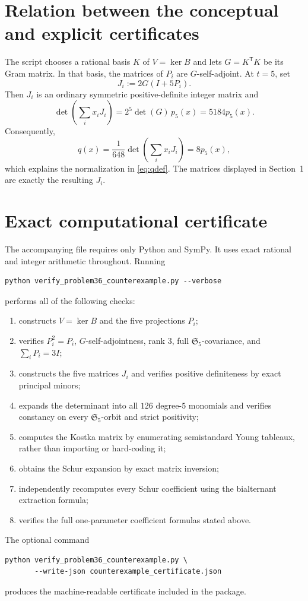 \documentclass[11pt]{article}
\theoremstyle{remark}
\newcommand{\Sym}{\mathfrak S}
\begin{document}
\section{Relation between the conceptual and explicit certificates}

The script chooses a rational basis $K$ of $V=\ker B$ and lets
$G=K^{\mathsf T}K$ be its Gram matrix.  In that basis, the matrices of $P_i$ are
$G$-self-adjoint.  At $t=5$, set
\[
J_i:=2G(I+5P_i).
\]
Then $J_i$ is an ordinary symmetric positive-definite integer matrix and
\[
\det\!\left(\sum_i x_iJ_i\right)
=2^5\det(G)\,p_5(x)=5184p_5(x).
\]
Consequently,
\[
q(x)=\frac1{648}\det\!\left(\sum_i x_iJ_i\right)=8p_5(x),
\]
which explains the normalization in \eqref{eq:qdef}.  The matrices displayed in
Section~1 are exactly the resulting $J_i$.

\section{Exact computational certificate}
\label{sec:certificate}

The accompanying file  requires only Python and SymPy.
It uses exact rational and integer arithmetic throughout.  Running
\begin{verbatim}
python verify_problem36_counterexample.py --verbose
\end{verbatim}
performs all of the following checks:
\begin{enumerate}[leftmargin=2em]
\item constructs $V=\ker B$ and the five projections $P_i$;
\item verifies $P_i^2=P_i$, $G$-self-adjointness, rank $3$, full
      $\Sym_5$-covariance, and $\sum_iP_i=3I$;
\item constructs the five matrices $J_i$ and verifies positive definiteness by
      exact principal minors;
\item expands the determinant into all $126$ degree-$5$ monomials and verifies
      constancy on every $\Sym_5$-orbit and strict positivity;
\item computes the Kostka matrix by enumerating semistandard Young tableaux,
      rather than importing or hard-coding it;
\item obtains the Schur expansion by exact matrix inversion;
\item independently recomputes every Schur coefficient using the bialternant
      extraction formula;
\item verifies the full one-parameter coefficient formulas stated above.
\end{enumerate}
The optional command
\begin{verbatim}
python verify_problem36_counterexample.py \
       --write-json counterexample_certificate.json
\end{verbatim}
produces the machine-readable certificate included in the package.
\end{document}
